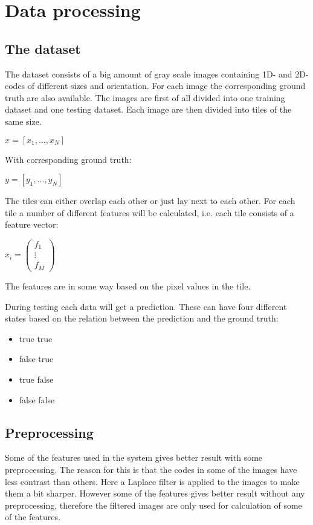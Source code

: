 \chapter{Data processing}
\label{sec:Data processing}

\section{The dataset}
\label{The dataset}
The dataset consists of a big amount of gray scale images containing 1D- and 2D-codes of different sizes and orientation. For each image the corresponding ground truth are also available. The images are first of all divided into one training dataset and one testing dataset. Each image are then divided into tiles of the same size. 
\begin{center}
	$x = [x_1,...,x_N]$
\end{center}
With corresponding ground truth:
\begin{center}
	$y = [y_1,...,y_N]$
\end{center}
The tiles can either overlap each other or just lay next to each other. For each tile a number of different features will be calculated, i.e. each tile consists of a feature vector:
\begin{center}
\begin{math}
	x_i =  
	\begin{pmatrix}
		 f_1 \\ \vdots \\ f_M
	\end{pmatrix}
\end{math}
\end{center}  
The features are in some way based on the pixel values in the tile.

During testing each data will get a prediction. These can have four different states based on the relation between the prediction and the ground truth:
\begin{itemize}
	\item true true
	\item false true
	\item true false
	\item false false
\end{itemize}

\section{Preprocessing}
\label{Preprocessing}
Some of the features used in the system gives better result with some preprocessing. The reason for this is that the codes in some of the images have less contrast than others. Here a Laplace filter is applied to the images to make them a bit sharper. However some of the features gives better result without any preprocessing, therefore the filtered images are only used for calculation of some of the features.

